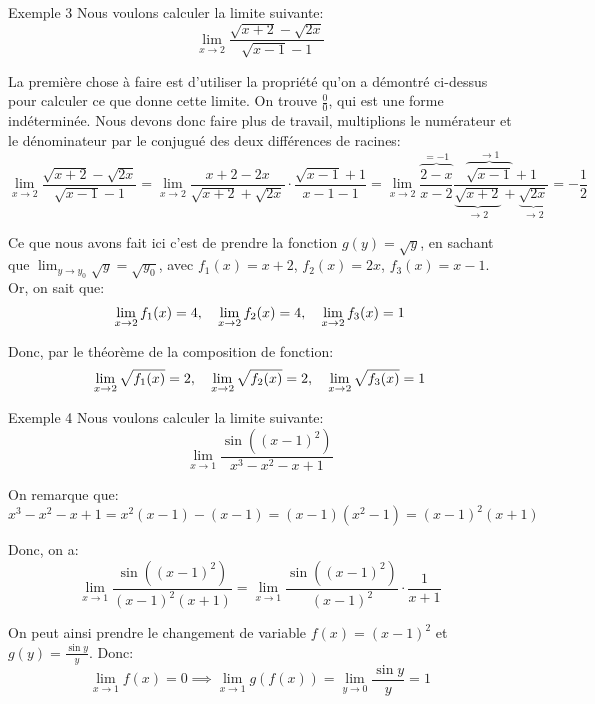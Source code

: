 \documentclass[a4paper]{article}
\begin{document}
\begin{parag}{Exemple 3}
    Nous voulons calculer la limite suivante:
    \[\lim_{x \to 2} \frac{\sqrt{x + 2} - \sqrt{2x}}{\sqrt{x - 1} - 1}\]

    La première chose à faire est d'utiliser la propriété qu'on a démontré ci-dessus pour calculer ce que donne cette limite. On trouve $\frac{0}{0}$, qui est une forme indéterminée. Nous devons donc faire plus de travail, multiplions le numérateur et le dénominateur par le conjugué des deux différences de racines:
    \[\lim_{x \to 2} \frac{\sqrt{x + 2} - \sqrt{2x}}{\sqrt{x - 1} - 1} = \lim_{x \to 2} \frac{x + 2 - 2x}{\sqrt{x + 2} + \sqrt{2x}} \cdot \frac{\sqrt{x - 1} + 1}{x - 1 - 1} = \lim_{x \to 2} \overbrace{\frac{2 - x}{x - 2}}^{= -1} \frac{\overbrace{\sqrt{x - 1}}^{\to 1} + 1}{\underbrace{\sqrt{x + 2}}_{\to 2} + \underbrace{\sqrt{2x}}_{\to 2}} = -\frac{1}{2}\]

    Ce que nous avons fait ici c'est de prendre la fonction $g\left(y\right) = \sqrt{y}$, en sachant que $\lim_{y \to y_0} \sqrt{y} = \sqrt{y_0}$, avec $f_1\left(x\right) = x + 2$, $f_2\left(x\right) = 2x$, $f_3\left(x\right) = x - 1$. Or, on sait que:
    \[\lim_{x \to 2} f_1\left(x\right) = 4, \mathspace \lim_{x \to 2} f_2\left(x\right) = 4, \mathspace \lim_{x \to 2} f_3\left(x\right) = 1\]

    Donc, par le théorème de la composition de fonction:
    \[\lim_{x \to 2} \sqrt{f_1\left(x\right)} = 2, \mathspace \lim_{x \to 2} \sqrt{f_2\left(x\right)} = 2, \mathspace \lim_{x \to 2} \sqrt{f_3\left(x\right)} = 1\]
\end{parag}

\begin{parag}{Exemple 4}
    Nous voulons calculer la limite suivante:
    \[\lim_{x \to 1} \frac{\sin\left(\left(x-1\right)^2\right)}{x^3 - x^2 - x + 1}\]

    On remarque que:
    \[x^3 - x^2 - x + 1 = x^2\left(x - 1\right) - \left(x - 1\right) = \left(x - 1\right)\left(x^2 - 1\right) = \left(x-1\right)^2\left(x+1\right)\]

    Donc, on a:
    \[\lim_{x \to 1} \frac{\sin\left(\left(x-1\right)^2\right)}{\left(x-1\right)^2 \left(x + 1\right)} = \lim_{x \to 1} \frac{\sin\left(\left(x-1\right)^2\right)}{\left(x-1\right)^2} \cdot \frac{1}{x + 1}\]

    On peut ainsi prendre le changement de variable $f\left(x\right) = \left(x - 1\right)^2$ et $g\left(y\right) = \frac{\sin y}{y}$. Donc:
    \[\lim_{x \to 1} f\left(x\right) = 0 \implies \lim_{x \to 1} g\left(f\left(x\right)\right) = \lim_{y \to 0} \frac{\sin y}{y} = 1\]

\end{parag}
\end{document}
